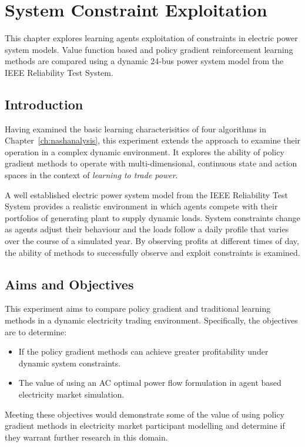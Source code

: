 \chapter{System Constraint Exploitation}
\label{ch:exploitation}
This chapter explores learning agents exploitation of constraints in electric
power system models.  Value function based and policy gradient reinforcement
learning methods are compared using a dynamic 24-bus power system model
from the IEEE Reliability Test System.

\section{Introduction}
Having examined the basic learning characterisitics of four algorithms in
Chapter~\ref{ch:nashanalysis}, this experiment extends the approach to examine
their operation in a complex dynamic environment.  It explores the ability of
policy gradient methods to operate with multi-dimensional, continuous state and
action spaces in the context of \textit{learning to trade power}.

A well established electric power system model from the IEEE Reliability Test
System \cite{ieee79rts} provides a realistic environment in which agents compete
with their portfolios of generating plant to supply dynamic loads. System
constraints change as agents adjust their behaviour and the loads follow a daily
profile that varies over the course of a simulated year.  By observing profits
at different times of day, the ability of methods to successfully observe and
exploit constraints is examined.

\section{Aims and Objectives}
This experiment aims to compare policy gradient and traditional learning methods
in a dynamic electricity trading environment.  Specifically, the objectives are
to determine:
\begin{itemize}
  \item If the policy gradient methods can achieve greater profitability
  under dynamic system constraints.
  \item The value of using an AC optimal power flow formulation in agent based
  electricity market simulation.
\end{itemize}
Meeting these objectives would demonstrate some of the value of using policy
gradient methods in electricity market participant modelling and determine if
they warrant further research in this domain.

